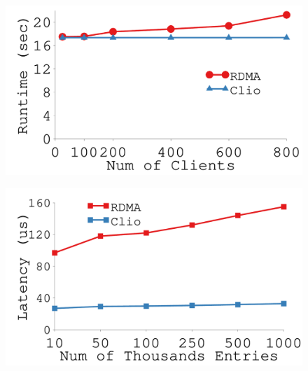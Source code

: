 {
\begin{figure}[th]
\begin{minipage}{\figWidthSix}
\begin{center}
\centerline{\includegraphics[width=\columnwidth]{Figures/g_plot_image_compression.pdf}}
\vspace{-0.1in}
\captionsetup{width=.9\columnwidth}
{
}
\end{center}
\end{minipage}
\begin{minipage}{\figWidthSix}
\begin{center}
\centerline{\includegraphics[width=\columnwidth]{Figures/g_plot_radix_tree.pdf}}
\vspace{-0.1in}
\captionsetup{width=.9\columnwidth}
{
}
\end{center}
\end{minipage}
\begin{minipage}{\figWidthSix}
\begin{center}

\end{center}
\end{minipage}
\end{figure}}
